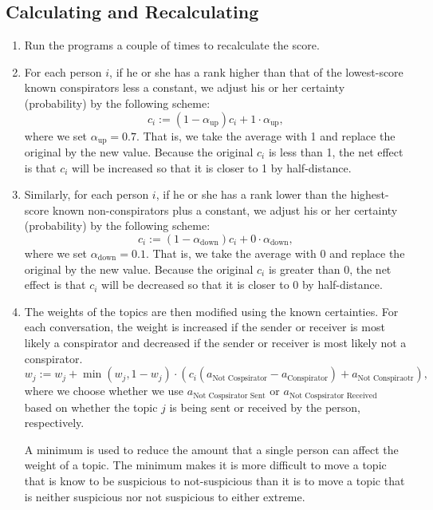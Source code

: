 \documentclass{icmmcm}
\begin{document}
\subsection{Calculating and Recalculating}
\begin{enumerate}

\item Run the programs a couple of times to recalculate
the score.

\item For each person $i$,
if he or she has a 
rank higher than that of the lowest-score known conspirators less a constant,
we adjust his or her certainty (probability) by the following scheme:
\begin{equation}
c_i := (1-\alpha_{\text{up}})c_i + 1\cdot \alpha_{\text{up}},
\label{push_up}
\end{equation}
where we set $\alpha_{\text{up}} = 0.7.$
That is, we take the average with 1 and replace the original by the new value. 
Because the original $c_i$ is less than 1, the net effect is that
$c_i$ will be increased so that it is closer to 1 by half-distance.

\item Similarly,
for each person $i$,
if he or she has a 
rank lower than the highest-score known non-conspirators plus a constant,
we adjust his or her certainty (probability) by the following scheme:
\begin{equation}
c_i := (1 - \alpha_{\text{down}})c_i + 0\cdot \alpha_{\text{down}},
\label{push_down}
\end{equation}
where we set $\alpha_{\text{down}} = 0.1.$
That is, we take the average with 0 and replace the original by the new value. 
Because the original $c_i$ is greater than 0, the net effect is that
$c_i$ will be decreased so that it is closer to 0 by half-distance.

\item The weights of the topics are then modified using the known certainties.  For each conversation, the weight is increased if the sender or receiver is most likely a conspirator and decreased if the sender or receiver is most likely not a conspirator. \[w_j := w_j + \min(w_j,1-w_j) \cdot (c_i(a_{\text{Not Cospsirator}}-a_{\text{Conspirator}})+a_{\text{Not Conspiraotr}}),\] 
where we choose whether we use $a_{\text{Not Cospsirator Sent}}$
or $a_{\text{Not Cospsirator Received}}$ based on whether
the topic $j$ is being sent or received by the person,
respectively.

A minimum is used to reduce the amount that a single person can affect the weight of a topic. The minimum makes it is more difficult to move a topic that is know to be suspicious to not-suspicious than it is to move a topic that is neither suspicious nor not suspicious  to either extreme. 
\end{enumerate}
\end{document}
